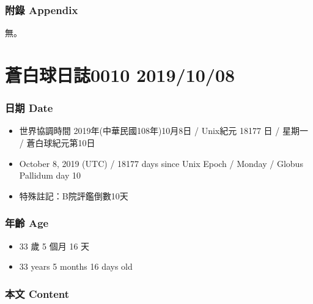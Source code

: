 \documentclass[
]{article}
\providecommand{\tightlist}{%
  \setlength{\itemsep}{0pt}\setlength{\parskip}{0pt}}
\begin{document}
\hypertarget{ux9644ux9304-appendix-2}{%
\subsubsection{附錄 Appendix}\label{ux9644ux9304-appendix-2}}

無。

\hypertarget{ux84bcux767dux7403ux65e5ux8a8c0010-20191008}{%
\section{蒼白球日誌0010
2019/10/08}\label{ux84bcux767dux7403ux65e5ux8a8c0010-20191008}}

\hypertarget{ux65e5ux671f-date-9}{%
\subsubsection{日期 Date}\label{ux65e5ux671f-date-9}}

\begin{itemize}
\tightlist
\item
  世界協調時間 2019年(中華民國108年)10月8日 / Unix紀元 18177 日 / 星期一
  / 蒼白球紀元第10日
\item
  October 8, 2019 (UTC) / 18177 days since Unix Epoch / Monday / Globus
  Pallidum day 10
\item
  特殊註記：B院評鑑倒數10天
\end{itemize}

\hypertarget{ux5e74ux9f61-age-9}{%
\subsubsection{年齡 Age}\label{ux5e74ux9f61-age-9}}

\begin{itemize}
\tightlist
\item
  33 歲 5 個月 16 天
\item
  33 years 5 months 16 days old
\end{itemize}

\hypertarget{ux672cux6587-content-9}{%
\subsubsection{本文 Content}\label{ux672cux6587-content-9}}
\end{document}
